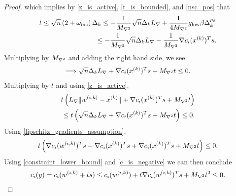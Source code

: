 \begin{proof}
which implies by \cref{z_is_active}, \cref{t_is_bounded}, and \cref{nsc_pos} that
\begin{align*}
t 
\le \sqrt{n} \left(2 + \omega_{\text{inc}} \right) \Delta_k 
\le -\frac 1 {{M_{\nabla^2}}} \sqrt{n}\Delta_k {L_{\nabla}} + \frac 1 {4{M_{\nabla^2}}} { g_{\textrm{low}} } \beta \Delta_k^{p_{\beta}} \\
\le -\frac 1 {{M_{\nabla^2}}} \sqrt{n}\Delta_k {L_{\nabla}} -\frac 1 {{M_{\nabla^2}}} \nabla c_i(x^{(k)})^Ts.
\end{align*}
Multiplying by ${M_{\nabla^2}}$ and adding the right hand side, we see
\begin{align*}
\Longrightarrow \sqrt{n}\Delta_k {L_{\nabla}} + \nabla c_i(x^{(k)})^Ts + {M_{\nabla^2}} t \le 0.
\end{align*}
Multiplying by $t$ and using \cref{z_is_active},
\begin{align*}
 t \left({L_{\nabla}}\|{w^{(i, k)}} - x^{(k)}\| + \nabla c_i(x^{(k)})^Ts + {M_{\nabla^2}} t\right) \\
 \le t \left(\sqrt{n}\Delta_k {L_{\nabla}} + \nabla c_i(x^{(k)})^Ts + {M_{\nabla^2}} t\right) \le 0.
\end{align*}
Using \cref{lipschitz_gradients_assumption},
\begin{align*}
t \left(\nabla c_i({w^{(i, k)}})^Ts - \nabla c_i(x^{(k)})^Ts + \nabla c_i(x^{(k)})^Ts + {M_{\nabla^2}} t\right) \le 0.
\end{align*}
Using \cref{constraint_lower_bound} and \cref{c_is_negative} we can then conclude
\begin{align*}
c_i(y) = c_i({w^{(i, k)}} + ts) \le c_i({w^{(i, k)}}) + t\nabla c_i({w^{(i, k)}})^Ts + {M_{\nabla^2}} t^2 \le 0.
\end{align*}

\end{proof}







